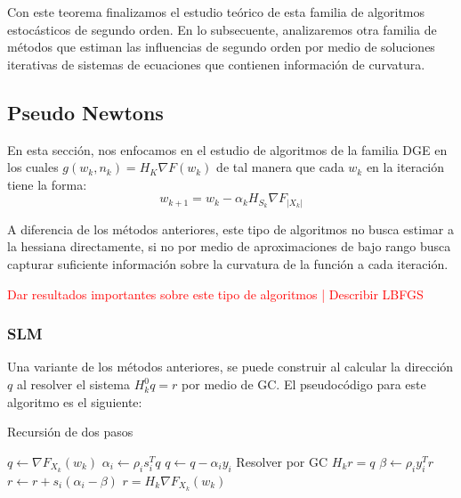\documentclass{book}
\theoremstyle{plain}
\theoremstyle{definition}
\theoremstyle{remark}
\begin{document}
Con este teorema finalizamos el estudio teórico de esta familia de algoritmos estocásticos de segundo orden. En lo subsecuente, analizaremos otra familia de métodos que estiman las influencias de segundo orden por medio de soluciones iterativas de sistemas de ecuaciones que contienen información de curvatura.

\subsection{Pseudo Newtons}

En esta sección, nos enfocamos en el estudio de algoritmos de la familia DGE en los cuales $g(w_k, n_k)=H_K\nabla F(w_k)$ de tal manera que cada $w_k$ en la iteración tiene la forma:
\begin{equation}\label{eq:gen_pseudo_newt}
    w_{k+1} = w_k - \alpha_k H_{S_k} \nabla F_{|X_k|}
\end{equation}

A diferencia de los métodos anteriores, este tipo de algoritmos no busca estimar a la hessiana directamente, si no por medio de aproximaciones de bajo rango busca capturar suficiente información sobre la curvatura de la función a cada iteración.

\textcolor{red}{Dar resultados importantes sobre este tipo de algoritmos | Describir LBFGS}

\subsubsection{SLM}

Una variante de los métodos anteriores, se puede construir al calcular la dirección $q$ al resolver el sistema $H_k^0q = r$ por medio de GC. El pseudocódigo para este algoritmo es el siguiente\cite{BYRD}:

 \begin{algorithm}[H]
   \caption{Recursión de dos pasos}
    \begin{algorithmic}[3]
      \State $q\gets \nabla F_{X_k}(w_k)$
        \State $\alpha_i\gets\rho_is_i^Tq$
        \State $q\gets q- \alpha_iy_i$
        \EndFor
        \State Resolver por GC $H_kr=q$
        \State $\beta\gets\rho_i y_i^Tr$
        \State $r\gets r + s_i(\alpha_i - \beta)$
        \EndFor
               \State \Return $r=H_k\nabla F_{X_k}(w_k)$
       \EndFunction
\end{algorithmic}
\end{algorithm}
\end{document}
